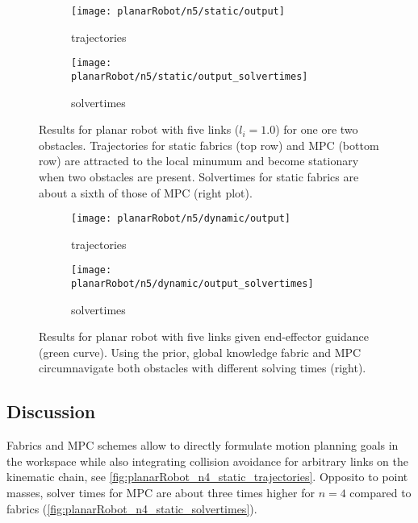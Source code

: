 \begin{figure}
  \begin{subfigure}[]{0.5\textwidth}
  \begin{center}
    \texttt{[image: planarRobot/n5/static/output]}
  \end{center}
  \caption{trajectories}
  \label{fig:planarRobot_n5_static_trajectories}
  \end{subfigure}%
  \begin{subfigure}[]{0.5\textwidth}
  \begin{center}
    \texttt{[image: planarRobot/n5/static/output\_solvertimes]}
  \end{center}
  \caption{solvertimes}
  \label{fig:planarRobot_n5_static_solvertimes}
  \end{subfigure}
  \caption{Results for planar robot with five links ($l_i=1.0$) for one ore two obstacles.
Trajectories for static fabrics (top row) and MPC (bottom row) are attracted to the local
minumum and become stationary when two obstacles are present. Solvertimes for static
fabrics are about a sixth of those of MPC (right plot).}%
  \label{fig:planarRobot_n5_static}
\end{figure}

\begin{figure}
  \begin{subfigure}[]{0.5\textwidth}
  \begin{center}
    \texttt{[image: planarRobot/n5/dynamic/output]}
  \end{center}
  \caption{trajectories}
  \label{fig:planarRobot_n5_dynamic_trajectories}
  \end{subfigure}%
  \begin{subfigure}[]{0.5\textwidth}
  \begin{center}
    \texttt{[image: planarRobot/n5/dynamic/output\_solvertimes]}
  \end{center}
  \caption{solvertimes}
  \label{fig:planarRobot_n5_dynamic_solvertimes}
  \end{subfigure}
  \caption{Results for planar robot with five links given end-effector guidance (green
curve). Using the prior, global knowledge fabric and MPC circumnavigate both obstacles
with different solving times (right).}%
  \label{fig:planarRobot_n5_dynamic}
\end{figure}

\subsection{Discussion}
Fabrics and MPC schemes allow to directly formulate motion planning goals in the
workspace while also integrating collision avoidance for arbitrary links on the kinematic
chain, see \cref{fig:planarRobot_n4_static_trajectories}. Opposito to point masses, solver
times for MPC are about three times higher for $n=4$ compared to fabrics
(\cref{fig:planarRobot_n4_static_solvertimes}).

